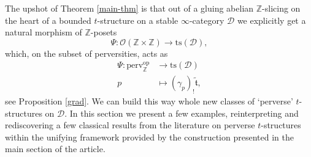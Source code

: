 \documentclass{article}
\newtheorem{lem}[thm]{Lemma}
\theoremstyle{definition}
\newcommand{\Z}{\mathbb{Z}}
\newcommand{\Oo}{\mathcal{O}}
\newcommand{\ts}{\mathrm{ts}}
\newcommand{\tee}{\mathfrak{t}}
\newcommand{\lex}{\times_{\textnormal{lex}}}
\newcommand{\triv}{\mathbb{Z}_{\textnormal{tri}}}
\begin{document}
%
%
 


The  upshot of Theorem \ref{main-thm} is that out of a gluing abelian $\Z$-slicing on the heart of a bounded $t$-structure on a stable $\infty$-category $\mathscr{D}$
we explicitly get a natural morphism of $\Z$-posets
\[
\Psi\colon\Oo(\Z\times\Z)\to \ts(\mathscr{D}),
\]
which, on the subset of perversities, acts as
\begin{align*}
\Psi\colon \mathrm{perv}_\Z^{\mathrm{op}}&\to \ts(\mathscr{D})\\
p&\mapsto (\gamma_p)_!\tilde{\tee},
\end{align*}
see Proposition \ref{grad}. We can build this way whole new classes of `perverse' $t$-structures on $\mathscr{D}$. In this section we present a few examples, reinterpreting and rediscovering a few classical results from the literature on perverse $t$-structures within the unifying framework provided by the construction presented in the main section of the article.
\end{document}
